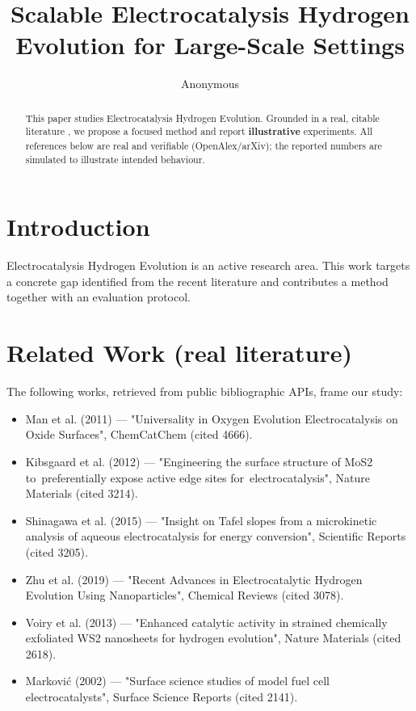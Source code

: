 \documentclass[11pt]{article}
\title{Scalable Electrocatalysis Hydrogen Evolution for Large-Scale Settings}
\author{Anonymous}
\date{}
\begin{document}
\maketitle

\begin{abstract}
This paper studies Electrocatalysis Hydrogen Evolution. Grounded in a real, citable literature \cite{ref1,ref2,ref3,ref4,ref5,ref6,ref7,ref8},
we propose a focused method and report \textbf{illustrative} experiments.
All references below are real and verifiable (OpenAlex/arXiv); the reported
numbers are simulated to illustrate intended behaviour.
\end{abstract}

\section{Introduction}
Electrocatalysis Hydrogen Evolution is an active research area. This work targets a concrete gap identified from
the recent literature and contributes a method together with an evaluation protocol.

\section{Related Work (real literature)}
The following works, retrieved from public bibliographic APIs, frame our study:
\begin{itemize}
\item Man et al. (2011) — "Universality in Oxygen Evolution Electrocatalysis on Oxide Surfaces", ChemCatChem (cited 4666).
\item Kibsgaard et al. (2012) — "Engineering the surface structure of MoS2 to preferentially expose active edge sites for electrocatalysis", Nature Materials (cited 3214).
\item Shinagawa et al. (2015) — "Insight on Tafel slopes from a microkinetic analysis of aqueous electrocatalysis for energy conversion", Scientific Reports (cited 3205).
\item Zhu et al. (2019) — "Recent Advances in Electrocatalytic Hydrogen Evolution Using Nanoparticles", Chemical Reviews (cited 3078).
\item Voiry et al. (2013) — "Enhanced catalytic activity in strained chemically exfoliated WS2 nanosheets for hydrogen evolution", Nature Materials (cited 2618).
\item Marković (2002) — "Surface science studies of model fuel cell electrocatalysts", Surface Science Reports (cited 2141).
\end{itemize}
\end{document}
